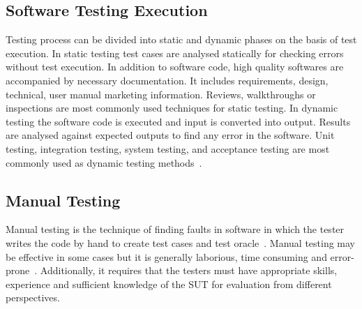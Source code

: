 {%




\subsection{Software Testing Execution}
Testing process can be divided into static and dynamic phases on the basis of test execution. In static testing test cases are analysed statically for checking errors without test execution. In addition to software code, high quality softwares are accompanied by necessary documentation. It includes requirements, design, technical, user manual marketing information. Reviews, walkthroughs or inspections are most commonly used techniques for static testing. In dynamic testing the software code is executed and input is converted into output. Results are analysed against expected outputs to find any error in the software. Unit testing, integration testing, system testing, and acceptance testing are most commonly used as dynamic testing methods~\cite{fairley1978tutorial}.




\subsection{Manual Testing}
Manual testing is the technique of finding faults in software in which the tester writes the code by hand to create test cases and test oracle~\cite{Ciupa2008}. Manual testing may be effective in some cases but it is generally laborious, time consuming and error-prone~\cite{tretmans1999}. Additionally, it requires that the testers must have appropriate skills, experience and sufficient knowledge of the SUT for evaluation from different perspectives.
 
}
